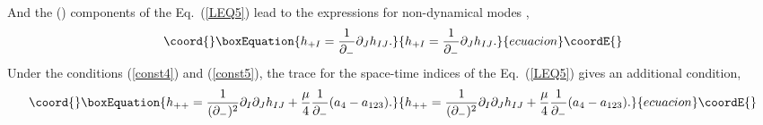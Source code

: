 \documentclass[a4paper,12pt]{article}
\numberwithin{equation}{section}
\begin{document}
And the (\coordHE{}) components of the Eq.~(\ref{LEQ5}) lead to the
expressions for non-dynamical modes \coordHE{},
\begin{equation}\coord{}\boxEquation{\label{const5}
 h_{+I} = \frac1{\partial_-}  \partial_J h_{IJ}.
}{h_{+I} = \frac1{\partial_-}  \partial_J h_{IJ}.
}{ecuacion}\coordE{}\end{equation}
Under the conditions (\ref{const4}) and (\ref{const5}), the trace for
the space-time indices of the Eq.~(\ref{LEQ5}) gives an additional
condition,
\begin{equation}\coord{}\boxEquation{\label{const6}
h_{++} = \frac1{(\partial_-)^2} \partial_I  \partial_J h_{IJ}
 + \frac{\mu}4  \frac1{\partial_-}(a_4 - a_{123}).
}{h_{++} = \frac1{(\partial_-)^2} \partial_I  \partial_J h_{IJ}
 + \frac{\mu}4  \frac1{\partial_-}(a_4 - a_{123}).
}{ecuacion}\coordE{}\end{equation}
\end{document}
